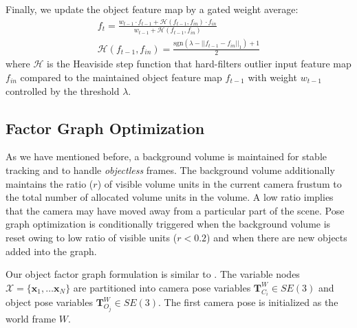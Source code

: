 Finally, we update the object feature map by a gated weight average:
\begin{align}
    f_t = \frac{w_{t-1} \cdot f_{t-1} + \mathcal{H}(f_{t-1}, f_{in}) \cdot f_{in}}{w_{t-1} + \mathcal{H}(f_{t-1}, f_{in})}\\
    \mathcal{H}(f_{t-1}, f_{in}) = \frac{\textrm{sgn}(\lambda - ||f_{t-1} - f_{in}||_1) + 1}{2}
\end{align}
where $\mathcal{H}$ is the Heaviside step function that hard-filters outlier input feature map $f_{in}$ compared to the maintained object feature map $f_{t-1}$ with weight $w_{t-1}$ controlled by the threshold $\lambda$.


\subsection{Factor Graph Optimization} \label{subsec: optimization}

As we have mentioned before, a background volume is maintained for stable tracking and to handle \textit{objectless} frames. The background volume additionally maintains the ratio ($r$) of visible volume units in the current camera frustum to the total number of allocated volume units in the volume. A low ratio implies that the camera may have moved away from a particular part of the scene. Pose graph optimization is conditionally triggered when the background volume is reset owing to low ratio of visible units ($r < 0.2$) and when there are new objects added into the graph.

Our object factor graph formulation is similar to \cite{salas-morenoSLAMSimultaneousLocalisation2013, mccormacFusionVolumetricObjectLevel2018}. The variable nodes $\mathcal{X} = \{\mathbf{x}_1, \dots \mathbf{x}_N\}$ are partitioned into camera pose variables $\mathbf{T}^{W}_{C_i} \in SE(3)$ and object pose variables $\mathbf{T}^W_{O_j} \in SE(3)$. The first camera pose is initialized as the world frame $W$.

